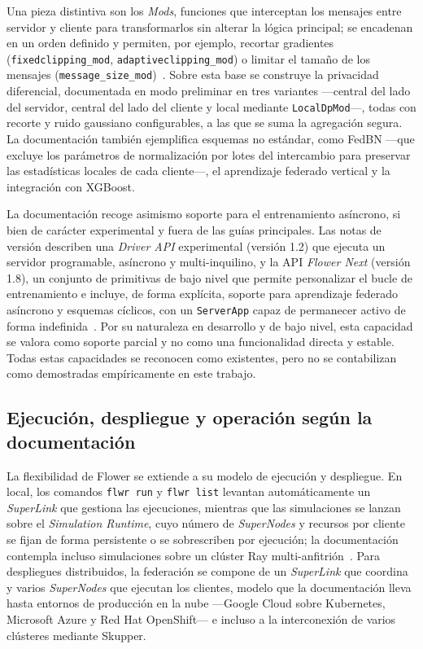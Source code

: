 Una pieza distintiva son los \textit{Mods}, funciones que interceptan los mensajes
entre servidor y cliente para transformarlos sin alterar la lógica principal; se
encadenan en un orden definido y permiten, por ejemplo, recortar gradientes
(\texttt{fixedclipping\_mod}, \texttt{adaptiveclipping\_mod}) o limitar el tamaño de
los mensajes (\texttt{message\_size\_mod})~\parencite{beutel2020flower}. Sobre esta
base se construye la privacidad diferencial, documentada en modo preliminar en tres
variantes —central del lado del servidor, central del lado del cliente y local
mediante \texttt{LocalDpMod}—, todas con recorte y ruido gaussiano configurables, a las
que se suma la agregación segura. La documentación también ejemplifica esquemas no
estándar, como FedBN —que excluye los parámetros de normalización por lotes del
intercambio para preservar las estadísticas locales de cada cliente—, el aprendizaje
federado vertical y la integración con XGBoost.

La documentación recoge asimismo soporte para el entrenamiento asíncrono, si bien de
carácter experimental y fuera de las guías principales. Las notas de versión describen
una \textit{Driver API} experimental (versión 1.2) que ejecuta un servidor programable,
asíncrono y multi-inquilino, y la API \textit{Flower Next} (versión 1.8), un conjunto de
primitivas de bajo nivel que permite personalizar el bucle de entrenamiento e incluye,
de forma explícita, soporte para aprendizaje federado asíncrono y esquemas cíclicos,
con un \texttt{ServerApp} capaz de permanecer activo de forma
indefinida~\parencite{beutel2020flower}. Por su naturaleza en desarrollo y de bajo
nivel, esta capacidad se valora como soporte parcial y no como una funcionalidad
directa y estable. Todas estas capacidades se reconocen como existentes, pero no se
contabilizan como demostradas empíricamente en este trabajo.

\subsection{Ejecución, despliegue y operación según la documentación}\label{subsec:flex-flower-deploy}

La flexibilidad de Flower se extiende a su modelo de ejecución y despliegue. En local,
los comandos \texttt{flwr run} y \texttt{flwr list} levantan automáticamente un
\textit{SuperLink} que gestiona las ejecuciones, mientras que las simulaciones se
lanzan sobre el \textit{Simulation Runtime}, cuyo número de \textit{SuperNodes} y
recursos por cliente se fijan de forma persistente o se sobrescriben por ejecución;
la documentación contempla incluso simulaciones sobre un clúster Ray
multi-anfitrión~\parencite{beutel2020flower}. Para despliegues distribuidos, la
federación se compone de un \textit{SuperLink} que coordina y varios
\textit{SuperNodes} que ejecutan los clientes, modelo que la documentación lleva hasta
entornos de producción en la nube —Google Cloud sobre Kubernetes, Microsoft Azure y
Red Hat OpenShift— e incluso a la interconexión de varios clústeres mediante Skupper.

